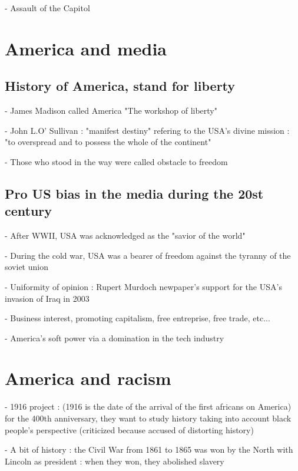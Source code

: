\documentclass[10pt]{article}
\begin{document}
- Assault of the Capitol





\section*{America and media}

\subsection*{History of America, stand for liberty}

- James Madison called America "The workshop of liberty"

- John L.O' Sullivan : "manifest destiny" refering to the USA's divine 
mission : "to overspread and to possess the whole of the continent"

- Those who stood in the way were called obstacle to freedom

\subsection*{Pro US bias in the media during the 20st century}

- After WWII, USA was acknowledged as the "savior of the world"

- During the cold war, USA was a bearer of freedom against the tyranny of 
the soviet union

- Uniformity of opinion : Rupert Murdoch newpaper's support for the USA's
 invasion of Iraq in 2003

- Business interest, promoting capitalism, free entreprise, free trade,
etc...

- America's soft power via a domination in the tech industry





\section*{America and racism}

- 1916 project : (1916 is the date of the arrival of the first africans on 
America) for the 400th anniversary, they want to study history taking into account
black people's perspective (criticized because accused of distorting history)

- A bit of history : the Civil War from 1861 to 1865 was won by the North with 
Lincoln as president : when they won, they abolished slavery
\end{document}
